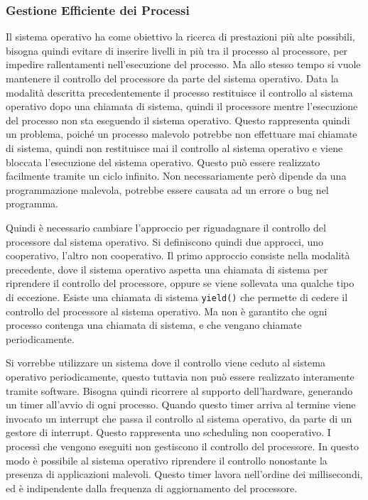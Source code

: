 \documentclass{article}
\numberwithin{equation}{subsection}
\begin{document}
\subsubsection{Gestione Efficiente dei Processi}

Il sistema operativo ha come obiettivo la ricerca di prestazioni più alte possibili, bisogna quindi evitare di inserire livelli in più tra il processo al processore, per 
impedire rallentamenti nell'esecuzione del processo. Ma allo stesso tempo si vuole mantenere il controllo del processore da parte del sistema operativo. 
Data la modalità descritta precedentemente il processo restituisce il controllo al sistema operativo dopo una chiamata di sistema, quindi il processore mentre l'esecuzione del 
processo non sta eseguendo il sistema operativo. Questo rappresenta quindi un problema, poiché un processo malevolo potrebbe non effettuare mai chiamate di sistema, quindi 
non restituisce mai il controllo al sistema operativo e viene bloccata l'esecuzione del sistema operativo. Questo può essere realizzato facilmente tramite un ciclo 
infinito. Non necessariamente però dipende da una programmazione malevola, potrebbe essere causata ad un errore o bug nel programma. 

Quindi è necessario cambiare l'approccio per riguadagnare il controllo del processore dal sistema operativo. Si definiscono quindi due approcci, uno cooperativo, l'altro 
non cooperativo. Il primo approccio consiste nella modalità precedente, dove il sistema operativo aspetta una chiamata di sistema per riprendere il controllo del processore, 
oppure se viene sollevata una qualche tipo di eccezione. 
Esiste una chiamata di sistema \verb|yield()| che permette di cedere il controllo del processore al sistema operativo. Ma non è garantito che ogni processo contenga 
una chiamata di sistema, e che vengano chiamate periodicamente. 

Si vorrebbe utilizzare un sistema dove il controllo viene ceduto al sistema operativo periodicamente, questo tuttavia non può essere realizzato interamente tramite 
software. Bisogna quindi ricorrere al supporto dell'hardware, generando un timer all'avvio di ogni processo. Quando questo timer arriva al termine viene invocato un 
interrupt che passa il controllo al sistema operativo, da parte di un gestore di interrupt. Questo rappresenta uno scheduling non cooperativo. I 
processi che vengono eseguiti non gestiscono il controllo del processore. In questo modo è possibile al sistema operativo riprendere il controllo nonostante la presenza 
di applicazioni malevoli. Questo timer lavora nell'ordine dei millisecondi, ed è indipendente dalla frequenza di aggiornamento del processore. 
\end{document}
